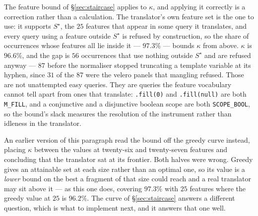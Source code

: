 The feature bound of \S\ref{sec:staircase} applies to $\kappa$, and applying it correctly
is a correction rather than a calculation. The translator's own feature set is the one to
use: it supports $S^\star$, the $25$ features that appear in some query it translates, and
every query using a feature outside $S^\star$ is refused by construction, so the share of
occurrences whose features all lie inside it --- $97.3\%$ --- bounds $\kappa$ from above.
$\kappa$ is $96.6\%$, and the gap is $56$ occurrences that use nothing outside $S^\star$
and are refused anyway --- $87$ before the normaliser stopped truncating a template
variable at its hyphen, since $31$ of the $87$ were the velero panels that mangling
refused. Those are not unattempted easy queries. They are queries the
feature vocabulary cannot tell apart from ones that translate: \texttt{.fill(0)} and
\texttt{.fill(null)} are both \texttt{M\_FILL}, and a conjunctive and a disjunctive
boolean scope are both \texttt{SCOPE\_BOOL}, so the bound's slack measures the resolution
of the instrument rather than idleness in the translator.

An earlier version of this paragraph read the bound off the greedy curve instead, placing
$\kappa$ between the values at twenty-six and twenty-seven features and concluding that
the translator sat at its frontier. Both halves were wrong. Greedy gives an attainable set
at each size rather than an optimal one, so its value is a \emph{lower} bound on the best
a fragment of that size could reach and a real translator may sit above it --- as this one
does, covering $97.3\%$ with $25$ features where the greedy value at $25$ is $96.2\%$. The
curve of \S\ref{sec:staircase} answers a different question, which is what to implement
next, and it answers that one well.


